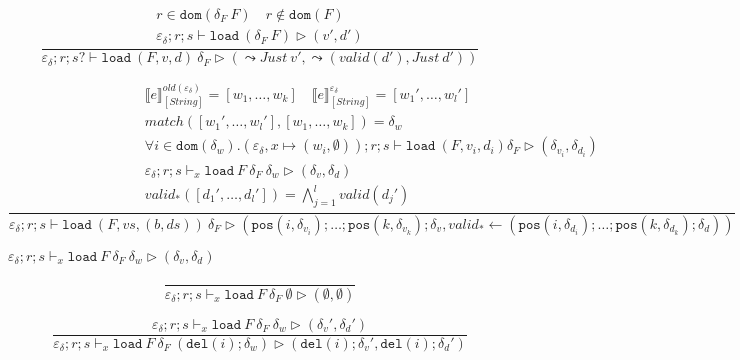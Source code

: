 \documentclass{report}
\theoremstyle{theorem}
\begin{document}
\begin{displaymath}
	\frac{\begin{array}{c}
		r \in \mathtt{dom}(\delta_F~F) \quad r \notin \mathtt{dom}(F)\\
		\varepsilon_\delta ; r ; s \vdash \mathtt{load}~ (\delta_F~F) \rhd (v',d')
	\end{array}}
	{\varepsilon_\delta ; r ; s? \vdash \mathtt{load}~ (F,v,d)~ \delta_F \rhd (\leadsto Just~v',\leadsto (valid(d'),Just~d'))}
\end{displaymath}

\begin{displaymath}
	\frac{\begin{array}{c}
		\llbracket e \rrbracket^{old(\varepsilon_\delta)}_{[String]} = [w_1,\dots,w_k] \quad
		\llbracket e \rrbracket^{\varepsilon_\delta}_{[String]} = [w_1',\dots,w_l']\\
		match([w_1',\dots,w_l'],[w_1,\dots,w_k]) = \delta_w\\
		\forall i \in \mathtt{dom}(\delta_w) . (\varepsilon_\delta,x \mapsto (w_i,\emptyset)) ; r ; s \vdash \mathtt{load}~ (F,v_i,d_i) \delta_F \rhd (\delta_{v_i},\delta_{d_i})\\
		\varepsilon_\delta ; r ; s \vdash_x \mathtt{load}~F~ \delta_F ~\delta_w \rhd (\delta_v,\delta_d)\\
		valid_*([d_1',\dots,d_l']) = \bigwedge_{j=1}^l valid(d_j')
	\end{array}}
	{\varepsilon_\delta ; r ; s \vdash \mathtt{load}~ (F,vs,(b,ds))~ \delta_F \rhd (\mathtt{pos}(i,\delta_{v_i}) ; \dots ; \mathtt{pos}(k,\delta_{v_k}) ; \delta_v,valid_* \leftarrow (\mathtt{pos}(i,\delta_{d_i}) ; \dots ; \mathtt{pos}(k,\delta_{d_k}) ; \delta_d))}
\end{displaymath}

$\boxed{\varepsilon_\delta ; r ; s \vdash_x \mathtt{load}~ F~ \delta_F~\delta_w \rhd (\delta_v,\delta_d)}$

\begin{displaymath}
	\frac{}
	{\varepsilon_\delta ; r ; s \vdash_x \mathtt{load}~F~ \delta_F ~\emptyset \rhd (\emptyset,\emptyset)}
\end{displaymath}

\begin{displaymath}
	\frac{
		\varepsilon_\delta ; r ; s \vdash_x \mathtt{load}~F~ \delta_F ~\delta_w \rhd (\delta_v',\delta_d')
	}
	{\varepsilon_\delta ; r ; s \vdash_x \mathtt{load}~F~ \delta_F ~(\mathtt{del}(i);\delta_w) \rhd (\mathtt{del}(i);\delta_v',\mathtt{del}(i);\delta_d')}
\end{displaymath}
\end{document}
